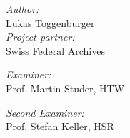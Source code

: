 \begin{titlepage}
\begin{center}
\vspace{25mm} %


\textit{Author:}\\
Lukas Toggenburger\\[35mm]



\textit{Project partner:}\\
Swiss Federal Archives

\textit{Examiner:}\\
Prof. Martin Studer, HTW

\textit{Second Examiner:}\\
Prof. Stefan Keller, HSR

\end{center}
\thispagestyle{empty}%
\end{titlepage}

\restoregeometry %
